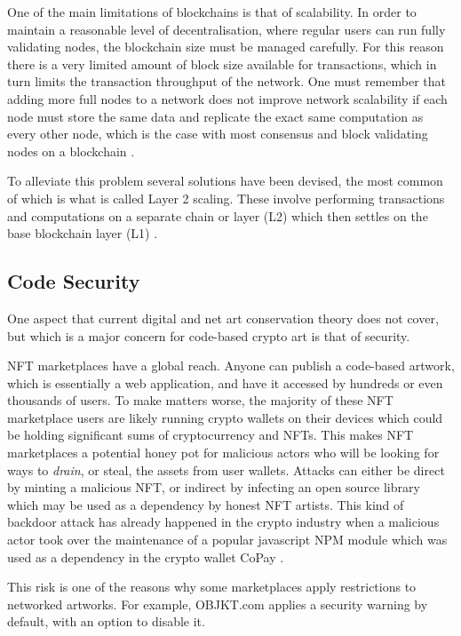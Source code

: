 One of the main limitations of blockchains is that of scalability. In order to maintain a reasonable level of decentralisation, where regular users can run fully validating nodes, the blockchain size must be managed carefully. For this reason there is a very limited amount of block size available for transactions, which in turn limits the transaction throughput of the network. One must remember that adding more full nodes to a network does not improve network scalability if each node must store the same data and replicate the exact same computation as every other node, which is the case with most consensus and block validating nodes on a blockchain \cite{khanSystematicLiteratureReview2021}.

To alleviate this problem several solutions have been devised, the most common of which is what is called Layer 2 scaling. These involve performing transactions and computations on a separate chain or layer (L2) which then settles on the base blockchain layer (L1) \cite{zhouSolutionsScalabilityBlockchain2020}.

\subsection{Code Security}
\label{sub:codesec}

One aspect that current digital and net art conservation theory does not cover, but which is a major concern for code-based crypto art is that of security.

NFT marketplaces have a global reach. Anyone can publish a code-based artwork, which is essentially a web application, and have it accessed by hundreds or even thousands of users. To make matters worse, the majority of these NFT marketplace users are likely running crypto wallets on their devices which could be holding significant sums of cryptocurrency and NFTs. This makes NFT marketplaces a potential honey pot for malicious actors who will be looking for ways to \emph{drain}, or steal, the assets from user wallets. Attacks can either be direct by minting a malicious NFT, or indirect by infecting an open source library which may be used as a dependency by honest NFT artists. This kind of backdoor attack has already happened in the crypto industry when a malicious actor took over the maintenance of a popular javascript NPM module which was used as a dependency in the crypto wallet CoPay \cite{haworthPopularJavaScriptDependency2018}.

This risk is one of the reasons why some marketplaces apply restrictions to networked artworks.
For example, OBJKT.com applies a security warning by default, with an option to disable it.

